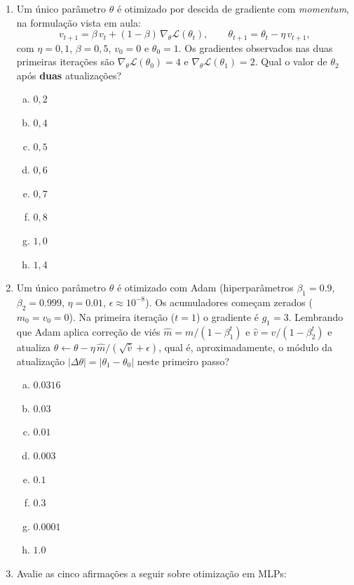 \documentclass{dlproblemset}
\begin{document}
\begin{enumerate}[1)]
    \item Um único parâmetro $\theta$ é otimizado por descida de gradiente com \textit{momentum}, na formulação vista em aula:
    \[
    v_{t+1} = \beta\,v_{t} + (1-\beta)\,\nabla_{\theta}\mathcal{L}(\theta_{t}), \qquad \theta_{t+1} = \theta_{t} - \eta\,v_{t+1},
    \]
    com $\eta = 0{,}1$, $\beta = 0{,}5$, $v_0 = 0$ e $\theta_0 = 1$. Os gradientes observados nas duas primeiras iterações são $\nabla_{\theta}\mathcal{L}(\theta_0) = 4$ e $\nabla_{\theta}\mathcal{L}(\theta_1) = 2$. Qual o valor de $\theta_2$ após \textbf{duas} atualizações?
    \begin{enumerate}[(a)]
        \item $0{,}2$
        \item $0{,}4$
        \item $0{,}5$
        \item $0{,}6$
        \item $0{,}7$
        \item $0{,}8$
        \item $1{,}0$
        \item $1{,}4$
    \end{enumerate}

    \item Um único parâmetro $\theta$ é otimizado com Adam (hiperparâmetros $\beta_1 = 0.9$, $\beta_2 = 0.999$, $\eta = 0.01$, $\epsilon \approx 10^{-8}$). Os acumuladores começam zerados ($m_0 = v_0 = 0$). Na primeira iteração ($t = 1$) o gradiente é $g_1 = 3$. Lembrando que Adam aplica correção de viés $\hat{m} = m / (1 - \beta_1^{t})$ e $\hat{v} = v / (1 - \beta_2^{t})$ e atualiza $\theta \leftarrow \theta - \eta\,\hat{m}/(\sqrt{\hat{v}} + \epsilon)$, qual é, aproximadamente, o módulo da atualização $|\Delta\theta| = |\theta_1 - \theta_0|$ neste primeiro passo?
    \begin{enumerate}[(a)]
        \item $0.0316$
        \item $0.03$
        \item $0.01$
        \item $0.003$
        \item $0.1$
        \item $0.3$
        \item $0.0001$
        \item $1.0$
    \end{enumerate}

    \item Avalie as cinco afirmações a seguir sobre otimização em MLPs:


\end{enumerate}
\end{document}
